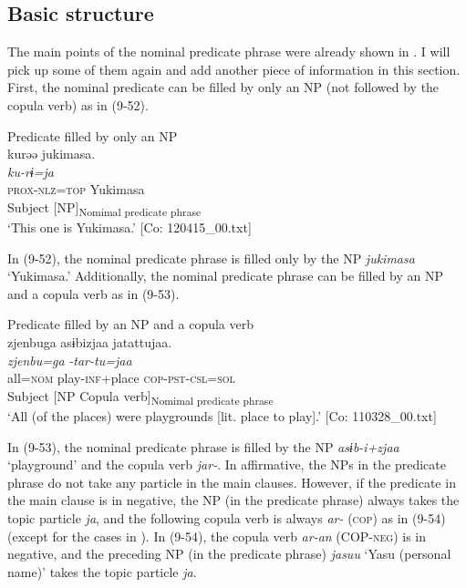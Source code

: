 \subsection{Basic structure}\label{sec:9.3.1}

The main points of the nominal predicate phrase were already shown in . I will pick up some of them again and add another piece of information in this section. First, the nominal predicate can be filled by only an NP (not followed by the copula verb) as in (9-52).

\ea   Predicate filled by only an NP \label{ex:9.52}\\
 \gllll  kurəə  jukimasa.\\
    \textit{ku-rɨ=ja}  \textit{}\\
    \textsc{prox}-\textsc{nlz}=\textsc{top}  Yukimasa\\
    Subject  [NP]\textsubscript{Nomimal predicate phrase}\\
    \glt     ‘This one is Yukimasa.’ [Co: 120415\_00.txt]
\z

In (9-52), the nominal predicate phrase is filled only by the NP \textit{jukimasa} ‘Yukimasa.’ Additionally, the nominal predicate phrase can be filled by an NP and a copula verb as in (9-53).

\ea   Predicate filled by an NP and a copula verb \label{ex:9.53}\\
 \gllll  zjenbuga  asɨbizjaa  jatattujaa.\\
    \textit{zjenbu=ga}  \textit{}  \textit{-tar-tu=jaa}\\
    all=\textsc{nom}  play-\textsc{inf}+place  \textsc{cop}-\textsc{pst}-\textsc{csl}=\textsc{sol}\\
    Subject  [NP  {Copula verb]\textsubscript{Nomimal predicate phrase}}\\
    \glt     ‘All (of the places) were playgrounds [lit. place to play].’ [Co: 110328\_00.txt]
\z

In (9-53), the nominal predicate phrase is filled by the NP \textit{asɨb-i+zjaa} ‘playground’ and the copula verb \textit{jar-}. In affirmative, the NPs in the predicate phrase do not take any particle in the main clauses. However, if the predicate in the main clause is in negative, the NP (in the predicate phrase) always takes the topic particle \textit{ja}, and the following copula verb is always \textit{ar-} (\textsc{cop}) as in (9-54) (except for the cases in ). In (9-54), the copula verb \textit{ar-an} (COP-\textsc{neg}) is in negative, and the preceding NP (in the predicate phrase) \textit{jasuu} ‘Yasu (personal name)’ takes the topic particle \textit{ja}.

